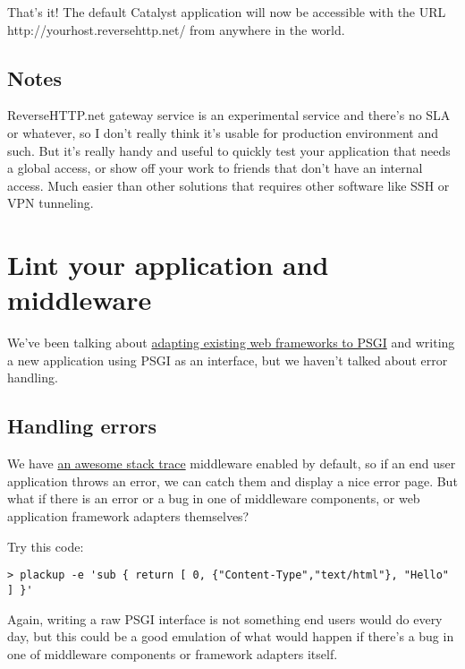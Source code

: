 That's it! The default Catalyst application will now be accessible with
the URL http://yourhost.reversehttp.net/ from anywhere in the world.

\section{Notes}\label{notes}

ReverseHTTP.net gateway service is an experimental service and there's
no SLA or whatever, so I don't really think it's usable for production
environment and such. But it's really handy and useful to quickly test
your application that needs a global access, or show off your work to
friends that don't have an internal access. Much easier than other
solutions that requires other software like SSH or VPN tunneling.

\chapter{Lint your application and
middleware}\label{day-21-lint-your-application-and-middleware}

We've been talking about
\href{http://advent.plackperl.org/2009/12/day-8-adapting-web-frameworks-to-psgi.html}{adapting
existing web frameworks to PSGI} and writing a new application using
PSGI as an interface, but we haven't talked about error handling.

\section{Handling errors}\label{handling-errors}

We have
\href{http://advent.plackperl.org/2009/12/day-3-using-plackup.html}{an
awesome stack trace} middleware enabled by default, so if an end user
application throws an error, we can catch them and display a nice error
page. But what if there is an error or a bug in one of middleware
components, or web application framework adapters themselves?

Try this code:

\begin{lstlisting}
> plackup -e 'sub { return [ 0, {"Content-Type","text/html"}, "Hello" ] }'
\end{lstlisting}

Again, writing a raw PSGI interface is not something end users would do
every day, but this could be a good emulation of what would happen if
there's a bug in one of middleware components or framework adapters
itself.

